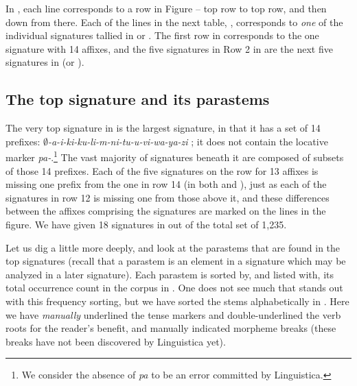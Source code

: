 \documentclass[output=paper,colorlinks,citecolor=brown]{langscibook}
\begin{document}
In ,  each line corresponds to a row in Figure  -- top row to top row, and then down from there. Each of the lines in the next table, , corresponds to \textit{one} of the individual signatures tallied in  or . The first row in  corresponds to the one signature with 14 affixes, and the five signatures in Row 2 in  are the next five signatures in  (or ). 




\subsection{The top signature and its parastems}
The very top signature in  is the largest signature, in that it has a  set of 14 prefixes: \textit{$\emptyset$-a-i-ki-ku-li-m-ni-tu-u-vi-wa-ya-zi} ; it does not contain the locative marker \textit{pa-}.\footnote{We consider the absence of \textit{pa} to be an error committed by Linguistica.} The vast majority of signatures beneath it are composed of subsets of those 14 prefixes. Each of the five signatures on the row for 13 affixes is missing one prefix from the one in row 14 (in both  and ), just as each of the signatures in row 12 is missing one from those above it, and these differences between the affixes comprising the signatures are marked on the lines in the figure. We have given 18 signatures in  out of the total set of 1,235. 
 
Let us dig a little more deeply, and look at the parastems that are found in the top signatures (recall that a parastem is an element in a signature which may be analyzed in a later signature). Each parastem is sorted by, and listed with, its total occurrence count in the corpus in . One does not see much that stands out with this frequency sorting, but we have sorted the stems alphabetically in . Here we have \textit{manually} underlined the tense markers and double-underlined the verb roots for the reader's benefit, and manually indicated morpheme breaks (these breaks have not been discovered by Linguistica yet). 
  
  
\end{document}
